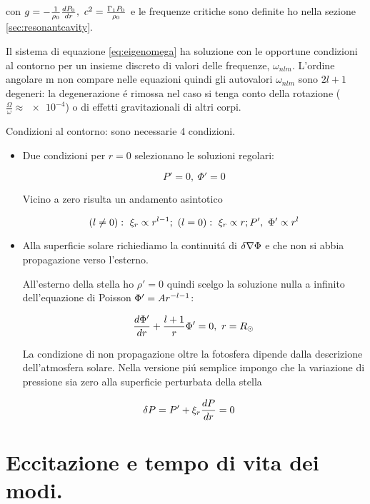 \documentclass[../main.tex]{subfiles}
\begin{document}
con $g=-\frac{1}{\rho_0}\TDy{r}{P_0},\ c^2=\frac{\Gamma_1P_0}{\rho_0}$ e le frequenze critiche sono definite ho nella sezione \ref{sec:resonantcavity}.


Il sistema di equazione \eqref{eq:eigenomega} ha soluzione con le opportune condizioni al contorno per un insieme discreto di valori delle frequenze, $\omega_{nlm}$. L'ordine angolare m non compare nelle equazioni quindi gli autovalori $\omega_{nlm}$ sono $2l+1$ degeneri: la degenerazione \'e rimossa nel caso si tenga conto della rotazione ($\frac{\Omega}{\omega}\approx\num{e-4}$) o di effetti gravitazionali di altri corpi.


Condizioni al contorno: sono necessarie 4 condizioni.

\begin{itemize}
\item Due condizioni per $r=0$ selezionano le soluzioni regolari:

\begin{equation}
P'=0,\ \Phi'=0
\end{equation}

Vicino a zero risulta un andamento asintotico

\begin{equation}
(l\neq0):\ \xi_r\propto r\expy{l-1};\ (l=0):\ \xi_r\propto r;P',\ \Phi'\propto r^l
\end{equation}

\item Alla superficie solare richiediamo la continuit\'a di $\Lvar{\nabla\Phi}$ e che non si abbia propagazione verso l'esterno.

All'esterno della stella ho $\rho'=0$ quindi scelgo la soluzione nulla a infinito dell'equazione di Poisson $\Phi'=Ar\expy{-l-1}$:

\begin{equation}
\TDy{r}{\Phi'}+\frac{l+1}{r}\Phi'=0,\ r=\rsun{}    
\end{equation}

La condizione di non propagazione oltre la fotosfera dipende dalla descrizione dell'atmosfera solare. Nella versione pi\'u semplice impongo che la variazione di pressione sia zero alla superficie perturbata della stella

\begin{align}
&\Lvar{P}=P'+\xi_r\TDy{r}{P}=0
\end{align}

\end{itemize}


\section{Eccitazione e tempo di vita dei modi.} \label{sec:excitation}
\end{document}

